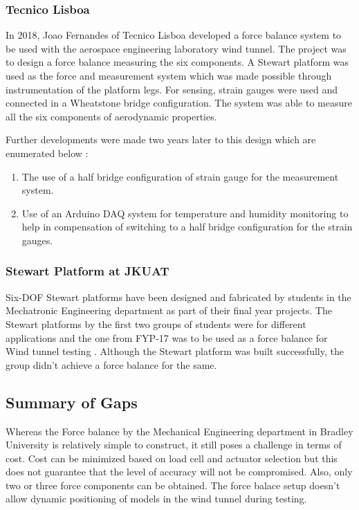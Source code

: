 \subsubsection{Tecnico Lisboa}
In 2018, Joao Fernandes of Tecnico Lisboa developed a force balance system to
be used with the aerospace engineering laboratory wind tunnel. The project was to
design a force balance measuring the six components. A Stewart platform was used as the
force and measurement system which was made possible through instrumentation of the platform legs.
For sensing, strain gauges were used and connected in a Wheatstone bridge configuration.
The system was able to measure all the six components of aerodynamic properties\cite{ferreira2015design}.

Further developments were made two years later to this design which are enumerated below \cite{ferreira2015design}:
\begin{enumerate}
\item The use of a half bridge configuration of strain gauge for the measurement system.
\item Use of an Arduino DAQ system for temperature and humidity monitoring to help in
compensation of switching to a half bridge configuration for the strain gauges.
\end{enumerate}
\subsubsection{Stewart Platform at JKUAT}
Six-DOF Stewart platforms have been designed and fabricated by students in the Mechatronic Engineering department as part of their final year projects. The Stewart platforms by the first two groups of students were for different applications and the one from FYP-17 was to be used as a force balance for Wind tunnel testing \cite{caleb}. Although the Stewart platform was built successfully, the group didn't achieve a force balance for the same. 
\subsection{Summary of Gaps}
Whereas the Force balance by the Mechanical Engineering department in Bradley University is relatively simple to construct, it still poses a challenge in terms of cost. Cost can be minimized based on load cell and actuator selection but this does not guarantee that the level of accuracy will not be compromised. Also, only two or three force components can be obtained. The force balace setup doesn't allow dynamic positioning of models in the wind tunnel during testing.

